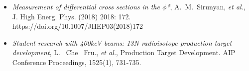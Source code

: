 \documentclass[11pt,a4paper,sans]{moderncv}        %
\makeatletter
\newcommand{\paper}[8]{
  \emph{#1}, #2 \href{#3}{#4 \textbf{#5} #6 (#7)}, \href{http://arxiv.org/abs/#8}{arXiv:~#8}
}
\newcommand*{\cventrylong}[7][.25em]{%

\cvitemlong[#1]{\parbox[t][0pt]{\hintscolumnwidth}{\raggedleft\hintstyle 
#2}}{%
     {\bfseries#3}%
     \ifthenelse{\equal{#4}{}}{}{, {\slshape#4}}%
     \ifthenelse{\equal{#5}{}}{}{, #5}%
     \ifthenelse{\equal{#6}{}}{}{, #6}%
     .\strut%
   }%
   \if\relax\detokenize{#7}\relax%
   \else{%
     \addvspace{3pt}\nobreak\@afterheading%
     \small%
     \begin{list}{}{%
       \setlength{\topsep}{0pt}%
       \setlength{\labelwidth}{0pt}%
       \setlength{\leftmargin}{\hintscolumnwidth+\separatorcolumnwidth}%
     }%
       \item #7%
     \end{list}%
   }%
   \fi%
   \par\addvspace{#1}%
}
\makeatother
\begin{document}
\vspace{9pt}
\begin{itemize}
\vspace{6pt}

\item \textit{Measurement of differential cross sections in the $\phi$*}, A.~M.~Sirunyan, \textit{et al.}, J. High Energ. Phys. (2018) 2018: 172. https://doi.org/10.1007/JHEP03(2018)172
\vspace{6pt}

\item \textit{Student research with 400keV beams: 13N radioisotope production target development}, L. ~Che ~Fru., \textit{et al.}, Production Target Development. AIP Conference Proceedings, 1525(1), 731-735.


\vspace{6pt}
\end{itemize}





\end{document}
